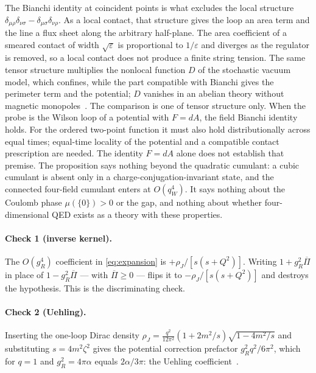 The Bianchi identity at coincident points is what excludes the local
structure $\delta_{\mu\rho}\delta_{\nu\sigma}-\delta_{\mu\sigma}\delta_{\nu\rho}$.
As a local contact, that structure gives the loop an area term and the line
a flux sheet along the arbitrary half-plane. The area coefficient of a
smeared contact of width $\sqrt\varepsilon$ is proportional to
$1/\varepsilon$ and diverges as the regulator is removed, so a local contact
does not produce a finite string tension. The same tensor structure multiplies
the nonlocal function $D$ of the stochastic vacuum model, which confines,
while the part compatible with Bianchi gives the perimeter term and the
potential; $D$ vanishes in an abelian theory without magnetic
monopoles~\cite{di_giacomo_dosch_shevchenko_simonov_2002}. The comparison is
one of tensor structure only. When the probe is the Wilson loop of a
potential with $F=dA$, the field Bianchi identity holds. For the ordered
two-point function it must also hold distributionally across equal times;
equal-time locality of the potential and a compatible contact prescription
are needed. The identity $F=dA$ alone does not establish that premise.
The proposition says
nothing beyond the quadratic cumulant: a cubic cumulant is absent only in a
charge-conjugation-invariant state, and the connected four-field cumulant
enters at $O(q_W^4)$. It says nothing about the Coulomb phase $\mu(\{0\})>0$
or the gap, and nothing about whether four-dimensional QED exists as a theory
with these properties.

\paragraph{Check 1 (inverse kernel).}
The $O(g_{R}^{4})$ coefficient in \eqref{eq:expansion} is
$+\rho_{J}/[s(s+Q^{2})]$. Writing $1+g_{R}^{2}\overline{\Pi}$ in place of
$1-g_{R}^{2}\overline{\Pi}$ --- with $\overline{\Pi}\ge0$ --- flips it to
$-\rho_{J}/[s(s+Q^{2})]$ and destroys the hypothesis. This is the
discriminating check.

\paragraph{Check 2 (Uehling).}
Inserting the one-loop Dirac density
$\rho_{J}=\frac{q^{2}}{12\pi^{2}}(1+2m^{2}/s)\sqrt{1-4m^{2}/s}$ and
substituting $s=4m^{2}\zeta^{2}$ gives the potential correction prefactor
$g_{R}^{2}q^{2}/6\pi^{2}$, which for $q=1$ and $g_{R}^{2}=4\pi\alpha$ equals
$2\alpha/3\pi$: the Uehling coefficient~\cite{uehling_1935}.

